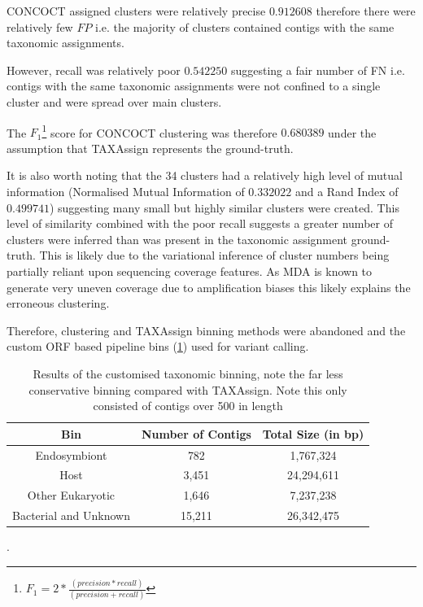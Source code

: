 CONCOCT assigned clusters were relatively precise \(0.912608\) 
therefore there were relatively few \(FP\) i.e. the majority of clusters 
contained contigs with the same taxonomic assignments. 

However, recall was relatively poor \(0.542250\) suggesting a
fair number of FN i.e. contigs with the same taxonomic assignments
were not confined to a single cluster and were spread over main clusters.

The \(F_1\)\footnote{\(F_1 = 2 * \frac{(precision * recall)}{(precision + recall)}\)} score for CONCOCT 
clustering was therefore \(0.680389\) under the assumption that 
TAXAssign represents the ground-truth. 

It is also worth noting that the 34 clusters had a relatively high level of mutual information
(Normalised Mutual Information of \(0.332022\) and a Rand Index of \(0.499741\)) suggesting
many small but highly similar clusters were created.  This level of similarity combined
with the poor recall suggests a greater number of clusters were inferred than was
present in the taxonomic assignment ground-truth.  This is likely due to
the variational inference of cluster numbers being partially reliant upon
sequencing coverage features.  As MDA is known to generate very uneven coverage 
due to amplification biases this likely explains the erroneous clustering.


Therefore, clustering and TAXAssign binning methods were abandoned and
the custom ORF based pipeline bins (\cref{tab:custom_tax_bin}) used
for variant calling.

\begin{table}
    \centering
    \begin{tabular}{|c|c|c|}
        \hline
        \textbf{Bin} & \textbf{Number of Contigs} & \textbf{Total Size (in \si{bp})} \\
        \hline
        Endosymbiont & 782 & 1,767,324\\
        Host & 3,451 &  24,294,611 \\
        \hline
        Other Eukaryotic & 1,646 & 7,237,238\\
        Bacterial and Unknown & 15,211 & 26,342,475 \\
        \hline
    \end{tabular}
    \caption[Custom Taxonomic Binning]{Results of the customised taxonomic binning,
    note the far less conservative binning compared with TAXAssign. Note this only
    consisted of contigs over \SI{500}{\bp} in length}.
\label{tab:custom_tax_bin}
\end{table}

